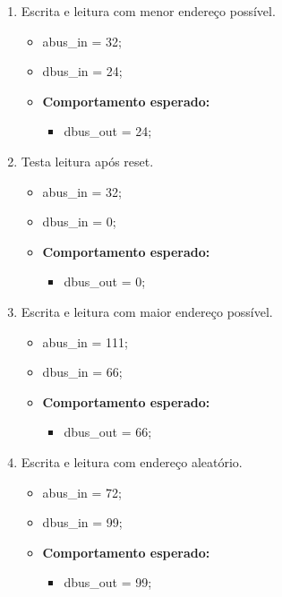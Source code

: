 \documentclass{article}
\begin{document}
\begin{enumerate}
    \item  Escrita e leitura com menor endereço possível.
    \begin{itemize}
        \item abus\_in = 32;
        \item dbus\_in = 24;
        \item \textbf{Comportamento esperado:}
        \begin{itemize}
            \item dbus\_out = 24;
        \end{itemize}
    \end{itemize}
    
    \item Testa leitura após reset.
    \begin{itemize}
        \item abus\_in = 32;
        \item dbus\_in = 0;
        \item \textbf{Comportamento esperado:}
        \begin{itemize}
            \item dbus\_out = 0;
        \end{itemize}
    \end{itemize}

    \item  Escrita e leitura com maior endereço possível.
    \begin{itemize}
        \item abus\_in = 111;
        \item dbus\_in = 66;
        \item \textbf{Comportamento esperado:}
        \begin{itemize}
            \item dbus\_out = 66;
        \end{itemize}
    \end{itemize}

    \item  Escrita e leitura com endereço aleatório.
    \begin{itemize}
        \item abus\_in = 72;
        \item dbus\_in = 99;
        \item \textbf{Comportamento esperado:}
        \begin{itemize}
            \item dbus\_out = 99;
        \end{itemize}
    \end{itemize}
\end{enumerate}
\end{document}
